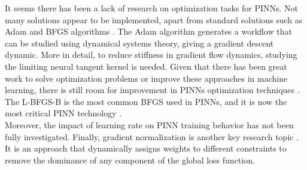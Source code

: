 \documentclass[pdflatex,sn-basic]{sn-jnl}%
\theoremstyle{thmstyleone}%
\theoremstyle{thmstyletwo}%
\theoremstyle{thmstylethree}%
\begin{document}
It seems there has been a lack of research on optimization tasks for PINNs. Not many solutions appear to be implemented,  apart from standard solutions such as Adam %
and BFGS algorithms \citep{Won2021_CanTransferNeuroevolution_GupWGO}.
%
The Adam algorithm generates a workflow that can be studied using dynamical systems theory, giving a gradient descent dynamic.
More in detail,  to reduce stiffness in gradient flow dynamics, studying the limiting neural tangent kernel is needed.
%
Given that there has been great work to solve optimization problems or improve these approaches in machine learning, 
there is still room for improvement in PINNs optimization techniques \citep{Sun2020_SurveyOptimizationMethods_CaoSCZZ}.
The L-BFGS-B is the most common BFGS used in PINNs, and it is now the most critical PINN technology \cite{Mar2021_OldNewCan_Mar}.
%
\noindent
\\
Moreover,  the impact of learning rate on PINN training behavior has not been fully investigated. 
%
Finally, gradient normalization is another key research topic \citep{Nan2022_DevelopingDigitalTwins_HenNHN}. It is an approach that dynamically assigns weights to different constraints to remove the dominance of any component of the global loss function. 






\end{document}
